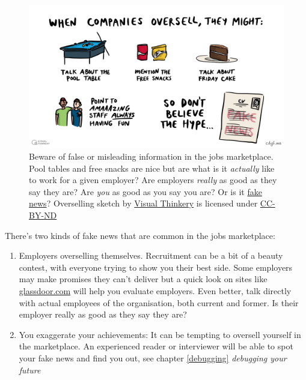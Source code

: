 \documentclass[
]{book}
\providecommand{\tightlist}{%
  \setlength{\itemsep}{0pt}\setlength{\parskip}{0pt}}
\begin{document}
\begin{figure}

{\centering \includegraphics[width=0.98\linewidth]{images/overselling} 

}

\caption{Beware of false or misleading information in the jobs marketplace. Pool tables and free snacks are nice but are what is it \emph{actually} like to work for a given employer? Are employers \emph{really} as good as they say they are? Are \emph{you} as good as you say you are? Or is it \href{https://en.wikipedia.org/wiki/Fake_news}{fake news}? Overselling sketch by \href{https://visualthinkery.com/}{Visual Thinkery} is licensed under \href{https://creativecommons.org/licenses/by-nd/4.0/}{CC-BY-ND}}\label{fig:fakenews-fig}
\end{figure}



There's two kinds of fake news that are common in the jobs marketplace:

\begin{enumerate}
\def\labelenumi{\arabic{enumi}.}
\tightlist
\item
  Employers overselling themselves. Recruitment can be a bit of a beauty contest, with everyone trying to show you their best side. Some employers may make promises they can't deliver but a quick look on sites like \href{https://www.glassdoor.com}{glassdoor.com} will help you evaluate employers. Even better, talk directly with actual employees of the organisation, both current and former. Is their employer really as good as they say they are?
\item
  You exaggerate your achievements: It can be tempting to oversell yourself in the marketplace. An experienced reader or interviewer will be able to spot your fake news and find you out, see chapter \ref{debugging} \emph{debugging your future}
\end{enumerate}
\end{document}
